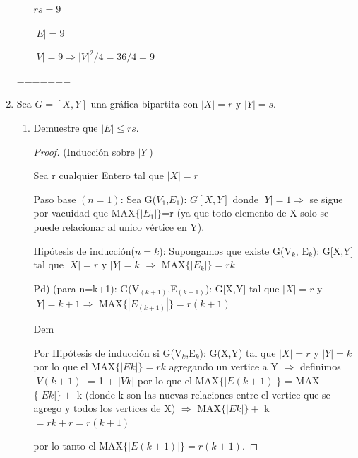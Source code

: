 \documentclass{article}
\begin{document}
\begin{enumerate}
\begin{enumerate}
\begin{figure}[ht!]
        \end{figure}
        $rs=9$

        $|E|=9$

        $|V|= 9 \Longrightarrow |V|^2/4 = 36/4 = 9$
    \end{enumerate}
=======
\item Sea $G = [X, Y]$ una gr\'afica bipartita con $|X| = r$ y $|Y| = s$.
  \begin{enumerate}
  \item Demuestre que $|E| \le rs$.
\begin{proof}
  (Inducción sobre $|Y|$) 
  
  Sea r cualquier Entero tal que $|X|=r$
  
  Paso base $(n = 1)$: Sea G($V_1$,$E_1$): $G[X,Y]$ donde $|Y|=1\Longrightarrow$  se sigue por vacuidad que MAX$\{|E_1|\}$=r (ya que todo elemento de X solo se puede relacionar al unico vértice  en Y). 
  
  Hipótesis de inducción($ n = k$): Supongamos que existe G(V$_k$, E$_k$): G[X,Y] tal que $|X|=r$ y $|Y|= k$ $\Longrightarrow$ MAX$\{|E_k|\} = rk$
  
  Pd) (para n=k+1): G(V$_{(k+1)}$,E$_{(k+1)}$): G[X,Y] tal que $|X|=r$ y $|Y|=k+1 \Longrightarrow$ 
  MAX$\{|E_{(k+1)}|\} = r(k+1)$
  
  Dem
  
  Por Hipótesis de inducción si G(V$_k$,E$_k$): G(X,Y) tal que $|X|=r$ y $|Y|=k$ por lo que 
  el MAX$\{|Ek|\}=rk $ agregando un vertice a Y $\Longrightarrow$ definimos $|V(k+1)|$ = 1 + $|Vk|$ por lo que el MAX$\{|E(k+1)|\}$ = MAX$\{|Ek|\} + $ k (donde k son las nuevas relaciones entre el vertice que se agrego y todos los vertices de X) $\Longrightarrow$ MAX$\{|Ek|\} + $ k $= rk +r = r(k+1)$
  
  por lo tanto el MAX$\{|E(k+1)|\} = r(k+1)$.
  

\end{proof}
\end{enumerate}
\end{enumerate}
\end{document}
